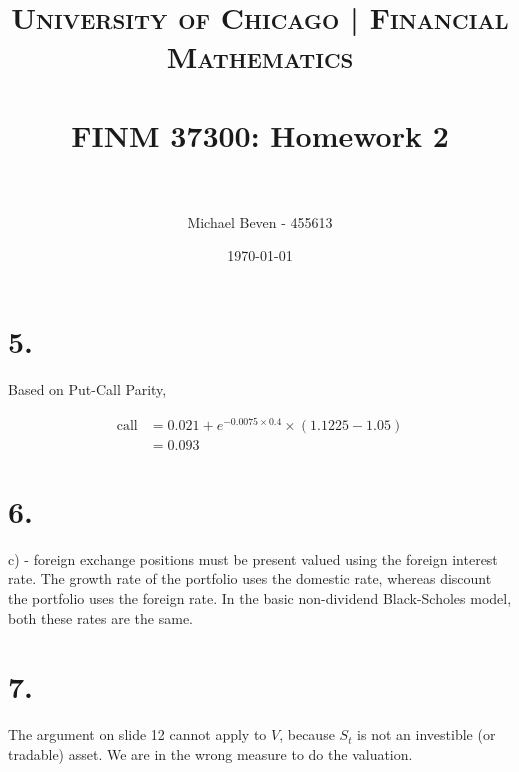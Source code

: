 \documentclass[paper=a4, fontsize=11pt]{scrartcl} %
\title{	
\normalfont \normalsize 
\textsc{University of Chicago | Financial Mathematics} \\ [25pt] %
\horrule{0.5pt} \\[0.4cm] %
\huge FINM 37300: Homework 2 \\ %
\horrule{2pt} \\[0.5cm] %
}
\author{Michael Beven - 455613} %
\date{\normalsize\today} %
\numberwithin{equation}{section} %
\numberwithin{figure}{section} %
\numberwithin{table}{section} %
\begin{document}
\maketitle %


\section*{5.}

Based on Put-Call Parity,

\begin{align*}
\text{call} &= 0.021 + e^{-0.0075 \times 0.4} \times (1.1225 - 1.05)\\
&= 0.093
\end{align*}


\section*{6.}

c) - foreign exchange positions must be present valued using the foreign interest rate.  The growth rate of the portfolio uses the domestic rate, whereas discount the portfolio uses the foreign rate.  In the basic non-dividend Black-Scholes model, both these rates are the same.  


\section*{7.}

The argument on slide 12 cannot apply to $V$, because $S_t$ is not an investible (or tradable) asset.  We are in the wrong measure to do the valuation. 

\end{document}

